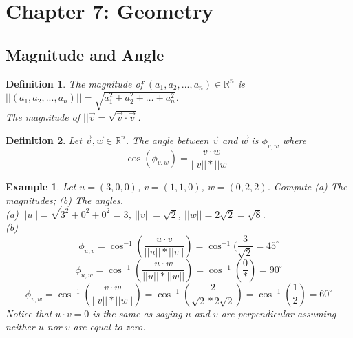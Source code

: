 \documentclass{report}
\newtheorem*{ex}{Example}
\newtheorem*{defn}{Definition}
\begin{document}
\section{Chapter 7: Geometry}
\subsection{Magnitude and Angle}
\begin{defn}
The magnitude of $(a_1,a_2,...,a_n)\in \mathbb{R}^n$ is $||(a_1,a_2,...,a_n)||=\sqrt{a_1^2+a_2^2+\dots +a_n^2}$.\\
The magnitude of $||\vec{v} = \sqrt{\vec{v}\cdot \vec{v}}$.
\end{defn}
\begin{defn}
Let $\vec{v},\vec{w}\in\mathbb{R}^n$. The angle between $\vec{v}$ and $\vec{w}$ is $\phi_{v,w}$ where
\[ \cos(\phi_{v,w})=\frac{v \cdot w}{||v|| * ||w||} \]
\end{defn}
\begin{ex}
Let $u=(3,0,0)$, $v=(1,1,0)$, $w=(0,2,2)$. Compute (a) The magnitudes; (b) The angles.\\
(a) $||u||=\sqrt{3^2+0^2+0^2} = 3$, $||v|| = \sqrt{2}$, $||w|| = 2\sqrt{2} = \sqrt{8}$.\\
(b) 
\[ \phi_{u,v}=\cos^{-1}(\frac{u\cdot v}{||u||*||v||}) = \cos^{-1}(\frac{3}{\sqrt{2}} = 45^\circ \]
\[ \phi_{u,w}= \cos^{-1}(\frac{u\cdot w}{||u||*||w||}) = \cos^{-1}(\frac{0}{*}) = 90^\circ \]
\[ \phi_{v,w} = \cos^{-1}(\frac{v\cdot w}{||v||*||w||}) = \cos^{-1}(\frac{2}{\sqrt{2}*2\sqrt{2}})=\cos^{-1}(\frac{1}{2})=60^\circ \]
Notice that $u \cdot v = 0$ is the same as saying $u$ and $v$ are perpendicular assuming neither $u$ nor $v$ are equal to zero.
\end{ex}
\end{document}
